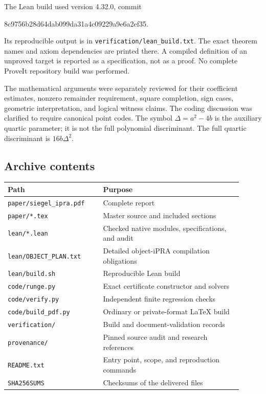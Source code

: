 \begin{samepage}
The Lean build used version 4.32.0, commit
\begin{center}\small\ttfamily
8c9756b28d64dab099da31a4c09229a9e6a2ef35.
\end{center}
\end{samepage}
Its reproducible output is in \texttt{verification/lean\_build.txt}.
The exact theorem names and axiom dependencies are printed there.
A compiled definition of an unproved target is reported as a
specification, not as a proof. No complete ProveIt repository build
was performed.

The mathematical arguments were separately reviewed for their
coefficient estimates, nonzero remainder requirement, square
completion, sign cases, geometric interpretation, and logical
witness claims. The coding discussion was clarified to require
canonical point codes. The symbol $\Delta=a^2-4b$ is the auxiliary
quartic parameter; it is not the full polynomial discriminant.
The full quartic discriminant is $16b\Delta^2$.

\subsection{Archive contents}

\begin{center}
\begin{tabular}{@{}p{0.37\linewidth}p{0.54\linewidth}@{}}
\toprule
Path & Purpose\\
\midrule
\texttt{paper/siegel\_ipra.pdf} & Complete report\\
\texttt{paper/*.tex} & Master source and included sections\\
\texttt{lean/*.lean} & Checked native modules, specifications, and audit\\
\texttt{lean/OBJECT\_PLAN.txt} & Detailed object-iPRA compilation obligations\\
\texttt{lean/build.sh} & Reproducible Lean build\\
\texttt{code/runge.py} & Exact certificate constructor and solvers\\
\texttt{code/verify.py} & Independent finite regression checks\\
\texttt{code/build\_pdf.py} & Ordinary or private-format LaTeX build\\
\texttt{verification/} & Build and document-validation records\\
\texttt{provenance/} & Pinned source audit and research references\\
\texttt{README.txt} & Entry point, scope, and reproduction commands\\
\texttt{SHA256SUMS} & Checksums of the delivered files\\
\bottomrule
\end{tabular}
\end{center}

